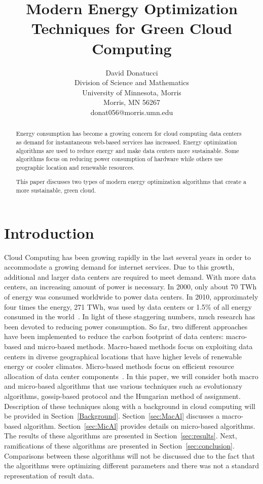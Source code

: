 \documentclass{sig-alternate}
\title{Modern Energy Optimization Techniques for Green Cloud Computing}
\author{
\alignauthor
 		David Donatucci\\
        Division of Science and Mathematics\\
        University of Minnesota, Morris\\
        Morris, MN 56267\\
        donat056@morris.umn.edu\\
}
\date{}
\begin{document}
\pagestyle{plain}

\maketitle

\begin{abstract}

Energy consumption has become a growing concern for cloud computing data centers as demand for instantaneous web-based services has increased. Energy optimization algorithms are used to reduce energy and make data centers more sustainable. Some algorithms focus on reducing power consumption of hardware while others use geographic location and renewable resources. 

This paper discusses two types of modern energy optimization algorithms that create a more sustainable, green cloud. 

\end{abstract}


\section{Introduction} \label{sec:intro}

Cloud Computing has been growing rapidly in the last several years in order to accommodate a growing demand for internet services. Due to this growth, additional and larger data centers are required to meet demand. With more data centers, an increasing amount of power is necessary. In 2000, only about 70 TWh of energy was consumed worldwide to power data centers. In 2010, approximately four times the energy, 271 TWh, was used by data centers or 1.5\% of all energy consumed in the world~\cite{Yanggratoke}. In light of these staggering numbers, much research has been devoted to reducing power consumption. So far, two different approaches have been implemented to reduce the carbon footprint of data centers: macro-based and micro-based methods. Macro-based methods focus on exploiting data centers in diverse geographical locations that have higher levels of renewable energy or cooler climates. Micro-based methods focus on efficient resource allocation of data center components~\cite{Hassan}. In this paper, we will consider both macro and micro-based algorithms that use various techniques such as evolutionary algorithms, gossip-based protocol and the Hungarian method of assignment. Description of these techniques along with a background in cloud computing will be provided in Section~\ref{Background}. Section~\ref{sec:MacAl} discusses a macro-based algorithm. Section~\ref{sec:MicAl} provides details on micro-based algorithms. The results of these algorithms are presented in Section~\ref{sec:results}. Next, ramifications of these algorithms are presented in Section~\ref{sec:conclusion}. Comparisons between these algorithms will not be discussed due to the fact that the algorithms were optimizing different parameters and there was not a standard representation of result data.
\end{document}
